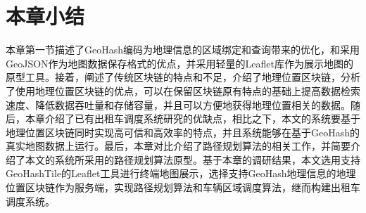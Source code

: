 \section{本章小结}
本章第一节描述了GeoHash编码为地理信息的区域绑定和查询带来的优化，和采用GeoJSON作为地图数据保存格式的优点，并采用轻量的Leaflet库作为展示地图的原型工具。接着，阐述了传统区块链的特点和不足，介绍了地理位置区块链，分析了使用地理位置区块链的优点，可以在保留区块链原有特点的基础上提高数据检索速度、降低数据吞吐量和存储容量，并且可以方便地获得地理位置相关的数据。随后，本章介绍了已有出租车调度系统研究的优缺点，相比之下，本文的系统要基于地理位置区块链同时实现高可信和高效率的特点，并且系统能够在基于GeoHash的真实地图数据上运行。最后，本章对比介绍了路径规划算法的相关工作，并简要介绍了本文的系统所采用的路径规划算法原型。基于本章的调研结果，本文选用支持GeoHashTile的Leaflet工具进行终端地图展示，选择支持GeoHash地理信息的地理位置区块链作为服务端，实现路径规划算法和车辆区域调度算法，继而构建出租车调度系统。